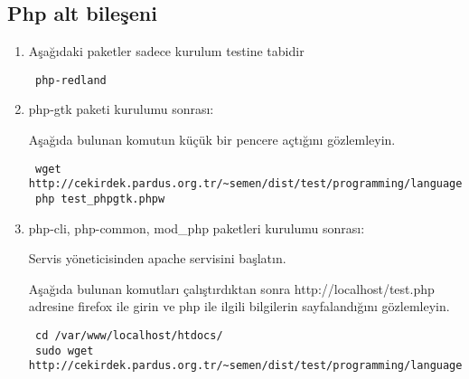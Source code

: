 \documentclass[a4paper,10pt]{article}
\begin{document}
\subsection{Php alt bileşeni}
\begin{enumerate}

\item Aşağıdaki paketler sadece kurulum testine tabidir
\begin{verbatim}
 php-redland
\end{verbatim}

\item php-gtk paketi kurulumu sonrası:

Aşağıda bulunan komutun küçük bir pencere açtığını gözlemleyin.
\begin{verbatim}
 wget http://cekirdek.pardus.org.tr/~semen/dist/test/programming/language/php/test_phpgtk.phpw
 php test_phpgtk.phpw
\end{verbatim}

\item php-cli, php-common, mod\_php paketleri kurulumu sonrası:

Servis yöneticisinden apache servisini başlatın.

Aşağıda bulunan komutları çalıştırdıktan sonra http://localhost/test.php adresine firefox ile girin ve php ile ilgili bilgilerin sayfalandığını gözlemleyin.

\begin{verbatim}
 cd /var/www/localhost/htdocs/
 sudo wget http://cekirdek.pardus.org.tr/~semen/dist/test/programming/language/php/test.php 
\end{verbatim}

\end{enumerate}
\end{document}

